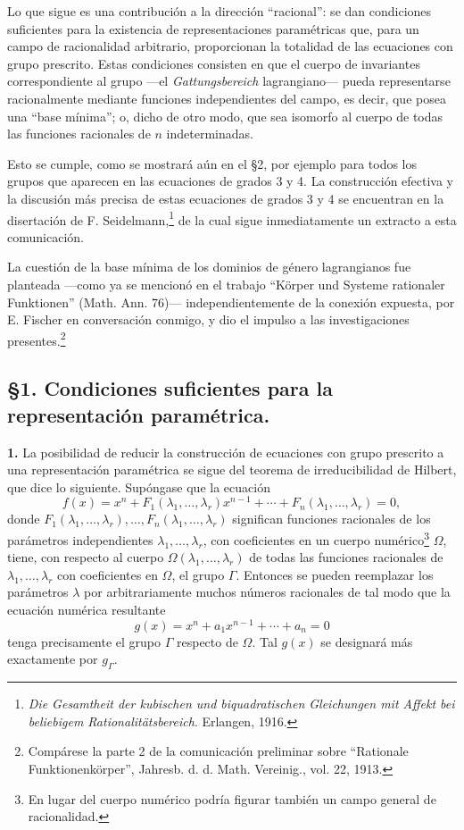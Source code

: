 Lo que sigue es una contribución a la dirección ``racional'': se dan condiciones suficientes para la existencia de representaciones paramétricas que, para un campo de racionalidad arbitrario, proporcionan la totalidad de las ecuaciones con grupo prescrito. Estas condiciones consisten en que el cuerpo de invariantes correspondiente al grupo ---el \emph{Gattungsbereich} lagrangiano--- pueda representarse racionalmente mediante funciones independientes del campo, es decir, que posea una ``base mínima''; o, dicho de otro modo, que sea isomorfo al cuerpo de todas las funciones racionales de $n$ indeterminadas.

Esto se cumple, como se mostrará aún en el \S 2, por ejemplo para todos los grupos que aparecen en las ecuaciones de grados 3 y 4. La construcción efectiva y la discusión más precisa de estas ecuaciones de grados 3 y 4 se encuentran en la disertación de F. Seidelmann,\footnote{\emph{Die Gesamtheit der kubischen und biquadratischen Gleichungen mit Affekt bei beliebigem Rationalitätsbereich}. Erlangen, 1916.} de la cual sigue inmediatamente un extracto a esta comunicación.

La cuestión de la base mínima de los dominios de género lagrangianos fue planteada ---como ya se mencionó en el trabajo ``Körper und Systeme rationaler Funktionen'' (Math. Ann. 76)--- independientemente de la conexión expuesta, por E. Fischer en conversación conmigo, y dio el impulso a las investigaciones presentes.\footnote{Compárese la parte 2 de la comunicación preliminar sobre ``Rationale Funktionenkörper'', Jahresb. d. d. Math. Vereinig., vol. 22, 1913.}

\subsection*{\S 1. Condiciones suficientes para la representación paramétrica.}

\textbf{1.} La posibilidad de reducir la construcción de ecuaciones con grupo prescrito a una representación paramétrica se sigue del teorema de irreducibilidad de Hilbert, que dice lo siguiente. Supóngase que la ecuación
\begin{equation}\tag{1}
f(x)=x^n+F_1(\lambda_1,\ldots,\lambda_r)x^{n-1}+\cdots+F_n(\lambda_1,\ldots,\lambda_r)=0,
\end{equation}
donde $F_1(\lambda_1,
\ldots,\lambda_r),\ldots,F_n(\lambda_1,\ldots,\lambda_r)$ significan funciones racionales de los parámetros independientes $\lambda_1,\ldots,\lambda_r$, con coeficientes en un cuerpo numérico\footnote{En lugar del cuerpo numérico podría figurar también un campo general de racionalidad.} $\Omega$, tiene, con respecto al cuerpo $\Omega(\lambda_1,
\ldots,\lambda_r)$ de todas las funciones racionales de $\lambda_1,
\ldots,\lambda_r$ con coeficientes en $\Omega$, el grupo $\Gamma$. Entonces se pueden reemplazar los parámetros $\lambda$ por arbitrariamente muchos números racionales de tal modo que la ecuación numérica resultante
\begin{equation}\tag{2}
g(x)=x^n+a_1x^{n-1}+\cdots+a_n=0
\end{equation}
tenga precisamente el grupo $\Gamma$ respecto de $\Omega$. Tal $g(x)$ se designará más exactamente por $g_\Gamma$.


